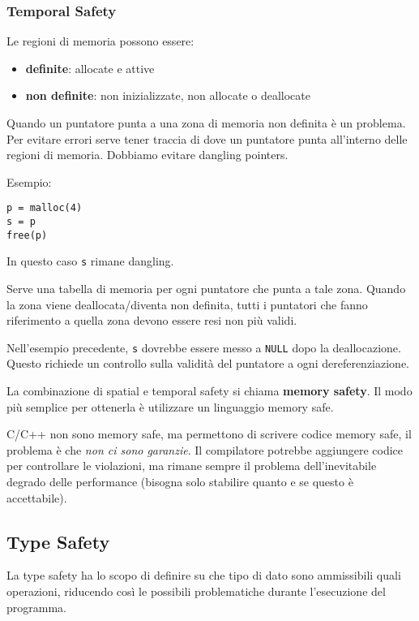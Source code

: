 \subsubsection{Temporal Safety}

Le regioni di memoria possono essere: 
\begin{itemize}
	\item \textbf{definite}: allocate e attive
    
	\item \textbf{non definite}: non inizializzate, non allocate o deallocate
\end{itemize}

Quando un puntatore punta a una zona di memoria non definita è un problema. Per evitare errori serve tener traccia di dove un puntatore punta all'interno delle regioni di memoria. Dobbiamo evitare dangling pointers.

Esempio: 
\begin{verbatim}
p = malloc(4)
s = p
free(p)
\end{verbatim}
In questo caso \texttt{s} rimane dangling.

Serve una tabella di memoria per ogni puntatore che punta a tale zona. Quando la zona viene deallocata/diventa non definita, tutti i puntatori che fanno riferimento a quella zona devono essere resi non più validi. 

Nell'esempio precedente, \texttt{s} dovrebbe essere messo a \texttt{NULL} dopo la deallocazione. Questo richiede un controllo sulla validità del puntatore a ogni dereferenziazione.

La combinazione di spatial e temporal safety si chiama \textbf{memory safety}. Il modo più semplice per ottenerla è utilizzare un linguaggio memory safe. 

C/C++ non sono memory safe, ma permettono di scrivere codice memory safe, il problema è che \textit{non ci sono garanzie}. Il compilatore potrebbe aggiungere codice per controllare le violazioni, ma rimane sempre il problema dell'inevitabile degrado delle performance (bisogna solo stabilire quanto e se questo è accettabile).


\subsection{Type Safety}

La type safety ha lo scopo di definire su che tipo di dato sono ammissibili quali operazioni, riducendo così le possibili problematiche durante l'esecuzione del programma.

